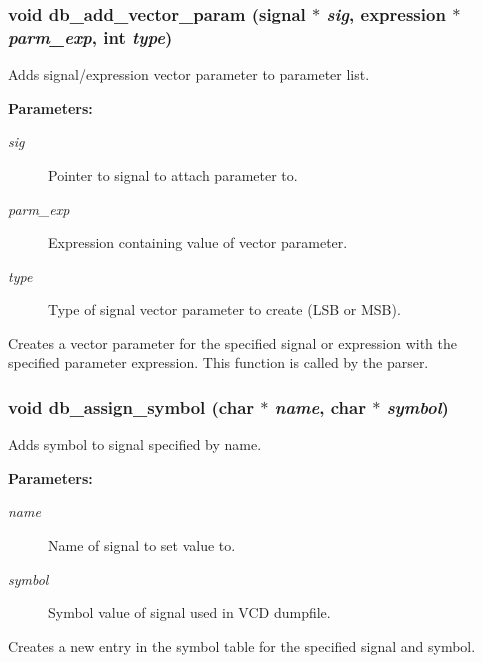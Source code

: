 \subsubsection{\setlength{\rightskip}{0pt plus 5cm}void db\_\-add\_\-vector\_\-param ({\bf signal} $\ast$ {\em sig}, {\bf expression} $\ast$ {\em parm\_\-exp}, int {\em type})}\label{db_8c_a24}


Adds signal/expression vector parameter to parameter list.

\begin{Desc}
\item[{\bf Parameters: }]\par
\begin{description}
\item[
{\em sig}]Pointer to signal to attach parameter to. \item[
{\em parm\_\-exp}]Expression containing value of vector parameter. \item[
{\em type}]Type of signal vector parameter to create (LSB or MSB).

\end{description}
\end{Desc}
Creates a vector parameter for the specified signal or expression with the specified parameter expression. This function is called by the parser. 
\subsubsection{\setlength{\rightskip}{0pt plus 5cm}void db\_\-assign\_\-symbol (char $\ast$ {\em name}, char $\ast$ {\em symbol})}\label{db_8c_a39}


Adds symbol to signal specified by name.

\begin{Desc}
\item[{\bf Parameters: }]\par
\begin{description}
\item[
{\em name}]Name of signal to set value to. \item[
{\em symbol}]Symbol value of signal used in VCD dumpfile.

\end{description}
\end{Desc}
Creates a new entry in the symbol table for the specified signal and symbol. 
